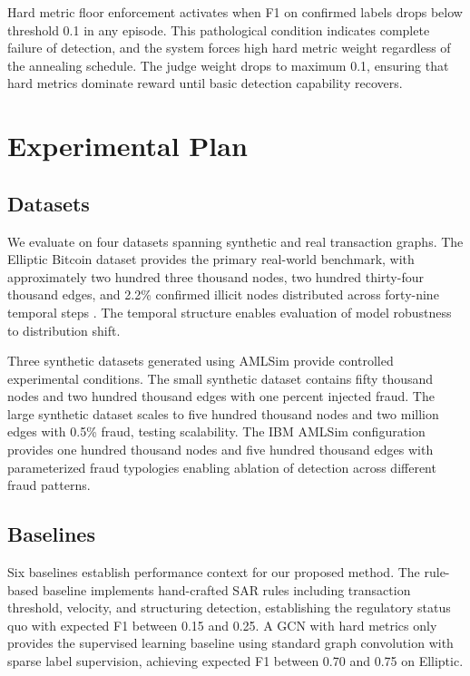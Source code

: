 \documentclass[11pt,a4paper]{article}
\begin{document}
Hard metric floor enforcement activates when F1 on confirmed labels drops below threshold 0.1 in any episode. This pathological condition indicates complete failure of detection, and the system forces high hard metric weight regardless of the annealing schedule. The judge weight drops to maximum 0.1, ensuring that hard metrics dominate reward until basic detection capability recovers.

\section{Experimental Plan}

\subsection{Datasets}

We evaluate on four datasets spanning synthetic and real transaction graphs. The Elliptic Bitcoin dataset provides the primary real-world benchmark, with approximately two hundred three thousand nodes, two hundred thirty-four thousand edges, and 2.2\% confirmed illicit nodes distributed across forty-nine temporal steps \citep{weber2019anti}. The temporal structure enables evaluation of model robustness to distribution shift.

Three synthetic datasets generated using AMLSim provide controlled experimental conditions. The small synthetic dataset contains fifty thousand nodes and two hundred thousand edges with one percent injected fraud. The large synthetic dataset scales to five hundred thousand nodes and two million edges with 0.5\% fraud, testing scalability. The IBM AMLSim configuration provides one hundred thousand nodes and five hundred thousand edges with parameterized fraud typologies enabling ablation of detection across different fraud patterns.

\subsection{Baselines}

Six baselines establish performance context for our proposed method. The rule-based baseline implements hand-crafted SAR rules including transaction threshold, velocity, and structuring detection, establishing the regulatory status quo with expected F1 between 0.15 and 0.25. A GCN with hard metrics only provides the supervised learning baseline using standard graph convolution with sparse label supervision, achieving expected F1 between 0.70 and 0.75 on Elliptic.
\end{document}
